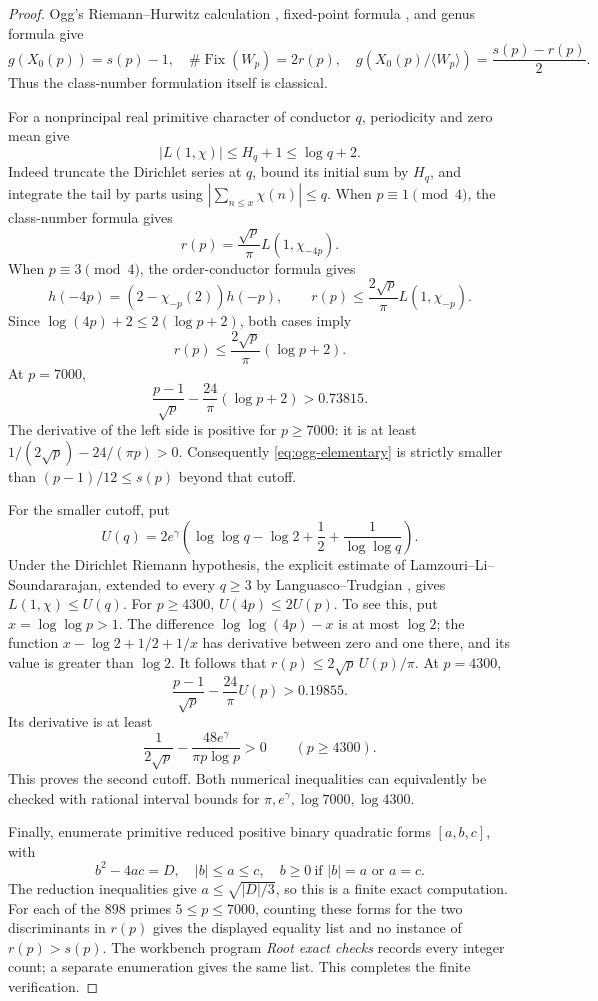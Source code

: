 \begin{proof}
Ogg's Riemann--Hurwitz calculation
\cite[p.~452]{Ogg1974}, fixed-point formula
\cite[p.~454]{Ogg1974}, and genus formula
\cite[p.~455]{Ogg1974} give
\[
 g(X_0(p))=s(p)-1,\quad
 \#\operatorname{Fix}(W_p)=2r(p),\quad
 g(X_0(p)/\langle W_p\rangle)=\frac{s(p)-r(p)}2.
\]
Thus the class-number formulation itself is classical.

For a nonprincipal real primitive character of conductor \(q\),
periodicity and zero mean give
\[
 |L(1,\chi)|\le H_q+1\le\log q+2.
\]
Indeed truncate the Dirichlet series at \(q\), bound its initial
sum by \(H_q\), and integrate the tail by parts using
\(\left|\sum_{n\le x}\chi(n)\right|\le q\).
When \(p\equiv1\pmod4\), the class-number formula gives
\[
 r(p)=\frac{\sqrt p}{\pi}L(1,\chi_{-4p}).
\]
When \(p\equiv3\pmod4\), the order-conductor formula gives
\[
 h(-4p)=(2-\chi_{-p}(2))h(-p),\qquad
 r(p)\le \frac{2\sqrt p}{\pi}L(1,\chi_{-p}).
\]
Since \(\log(4p)+2\le2(\log p+2)\), both cases imply
\begin{equation}\label{eq:ogg-elementary}
 r(p)\le\frac{2\sqrt p}{\pi}(\log p+2).
\end{equation}
At \(p=7000\),
\[
 \frac{p-1}{\sqrt p}-\frac{24}{\pi}(\log p+2)>0.73815.
\]
The derivative of the left side is positive for \(p\ge7000\):
it is at least \(1/(2\sqrt p)-24/(\pi p)>0\).
Consequently \eqref{eq:ogg-elementary} is strictly smaller
than \((p-1)/12\le s(p)\) beyond that cutoff.

For the smaller cutoff, put
\[
 U(q)=2e^\gamma
 \left(\log\log q-\log2+\frac12+\frac1{\log\log q}\right).
\]
Under the Dirichlet Riemann hypothesis, the explicit estimate of
Lamzouri--Li--Soundararajan, extended to every \(q\ge3\) by
Languasco--Trudgian \cite[Theorem~1]{LT2022}, gives
\(L(1,\chi)\le U(q)\).
For \(p\ge4300\), \(U(4p)\le2U(p)\).
To see this, put \(x=\log\log p>1\).
The difference \(\log\log(4p)-x\) is at most \(\log2\);
the function \(x-\log2+1/2+1/x\) has derivative between zero
and one there, and its value is greater than \(\log2\).
It follows that \(r(p)\le2\sqrt p\,U(p)/\pi\).
At \(p=4300\),
\[
 \frac{p-1}{\sqrt p}-\frac{24}{\pi}U(p)>0.19855.
\]
Its derivative is at least
\[
 \frac1{2\sqrt p}-\frac{48e^\gamma}{\pi p\log p}>0
 \qquad(p\ge4300).
\]
This proves the second cutoff. Both numerical inequalities can
equivalently be checked with rational interval bounds for
\(\pi,e^\gamma,\log7000,\log4300\).

Finally, enumerate primitive reduced positive binary quadratic forms
\([a,b,c]\), with
\[
 b^2-4ac=D,\quad |b|\le a\le c,\quad
 b\ge0\ \text{if } |b|=a\text{ or }a=c.
\]
The reduction inequalities give \(a\le\sqrt{|D|/3}\), so this is
a finite exact computation. For each of the \(898\) primes
\(5\le p\le7000\), counting these forms for the two discriminants
in \(r(p)\) gives the displayed equality list and no instance of
\(r(p)>s(p)\). The workbench program \emph{Root exact checks}
records every integer count; a separate enumeration gives the
same list. This completes the finite verification.
\end{proof}

